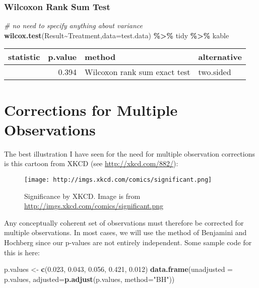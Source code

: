 \documentclass[
]{article}
\newenvironment{Shaded}{\begin{snugshade}}{\end{snugshade}}
\newcommand{\AttributeTok}[1]{\textcolor[rgb]{0.13,0.29,0.53}{#1}}
\newcommand{\CommentTok}[1]{\textcolor[rgb]{0.56,0.35,0.01}{\textit{#1}}}
\newcommand{\FloatTok}[1]{\textcolor[rgb]{0.00,0.00,0.81}{#1}}
\newcommand{\FunctionTok}[1]{\textcolor[rgb]{0.13,0.29,0.53}{\textbf{#1}}}
\newcommand{\NormalTok}[1]{#1}
\newcommand{\OtherTok}[1]{\textcolor[rgb]{0.56,0.35,0.01}{#1}}
\newcommand{\SpecialCharTok}[1]{\textcolor[rgb]{0.81,0.36,0.00}{\textbf{#1}}}
\newcommand{\StringTok}[1]{\textcolor[rgb]{0.31,0.60,0.02}{#1}}
\begin{document}
\subsubsection{Wilcoxon Rank Sum Test}\label{wilcoxon-rank-sum-test}

\begin{Shaded}
\begin{Highlighting}[]
\CommentTok{\# no need to specify anything about variance}
\FunctionTok{wilcox.test}\NormalTok{(Result}\SpecialCharTok{\textasciitilde{}}\NormalTok{Treatment,}\AttributeTok{data=}\NormalTok{test.data) }\SpecialCharTok{\%\textgreater{}\%}\NormalTok{ tidy }\SpecialCharTok{\%\textgreater{}\%}\NormalTok{ kable}
\end{Highlighting}
\end{Shaded}

\begin{longtable}[]{@{}rrll@{}}
\toprule\noalign{}
statistic & p.value & method & alternative \\
\midrule\noalign{}
\endhead
\bottomrule\noalign{}
\endlastfoot
12 & 0.394 & Wilcoxon rank sum exact test & two.sided \\
\end{longtable}

\section{Corrections for Multiple
Observations}\label{corrections-for-multiple-observations}

The best illustration I have seen for the need for multiple observation
corrections is this cartoon from XKCD (see \url{http://xkcd.com/882/}):

\begin{figure}
\centering
\texttt{[image: http://imgs.xkcd.com/comics/significant.png]}
\caption{Significance by XKCD. Image is from
\url{http://imgs.xkcd.com/comics/significant.png}}
\end{figure}

Any conceptually coherent set of observations must therefore be
corrected for multiple observations. In most cases, we will use the
method of Benjamini and Hochberg since our p-values are not entirely
independent. Some sample code for this is here:

\begin{Shaded}
\begin{Highlighting}[]
\NormalTok{p.values }\OtherTok{\textless{}{-}} \FunctionTok{c}\NormalTok{(}\FloatTok{0.023}\NormalTok{, }\FloatTok{0.043}\NormalTok{, }\FloatTok{0.056}\NormalTok{, }\FloatTok{0.421}\NormalTok{, }\FloatTok{0.012}\NormalTok{)}
\FunctionTok{data.frame}\NormalTok{(}\AttributeTok{unadjusted =}\NormalTok{ p.values, }\AttributeTok{adjusted=}\FunctionTok{p.adjust}\NormalTok{(p.values, }\AttributeTok{method=}\StringTok{"BH"}\NormalTok{))}
\end{Highlighting}
\end{Shaded}
\end{document}
